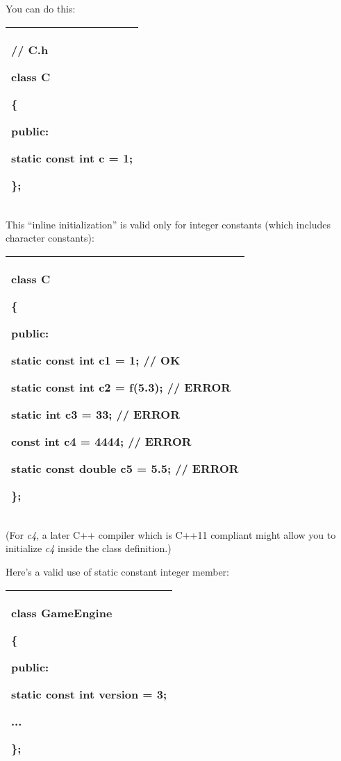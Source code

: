 \documentclass[
]{article}
\begin{document}
You can do this:

\begin{longtable}[]{@{}l@{}}
\toprule
\endhead
\begin{minipage}[t]{0.97\columnwidth}\raggedright
// C.h

class C

\{

public:

static const int c \textbf{= 1};

\};\strut
\end{minipage}\tabularnewline
\bottomrule
\end{longtable}

This ``inline initialization'' is valid only for integer constants
(which includes character constants):

\begin{longtable}[]{@{}l@{}}
\toprule
\endhead
\begin{minipage}[t]{0.97\columnwidth}\raggedright
class C

\{

public:

static const int c1 = 1; // OK

static const int c2 = f(5.3); // ERROR

static int c3 = 33; // ERROR

const int c4 = 4444; // ERROR

static const double c5 = 5.5; // ERROR

\};\strut
\end{minipage}\tabularnewline
\bottomrule
\end{longtable}

(For \emph{c4}, a later C++ compiler which is C++11 compliant might
allow you to initialize \emph{c4} inside the class definition.)

Here's a valid use of static constant integer member:

\begin{longtable}[]{@{}l@{}}
\toprule
\endhead
\begin{minipage}[t]{0.97\columnwidth}\raggedright
class GameEngine

\{

public:

static const int version = 3;

...

\};\strut
\end{minipage}\tabularnewline
\bottomrule
\end{longtable}
\end{document}
